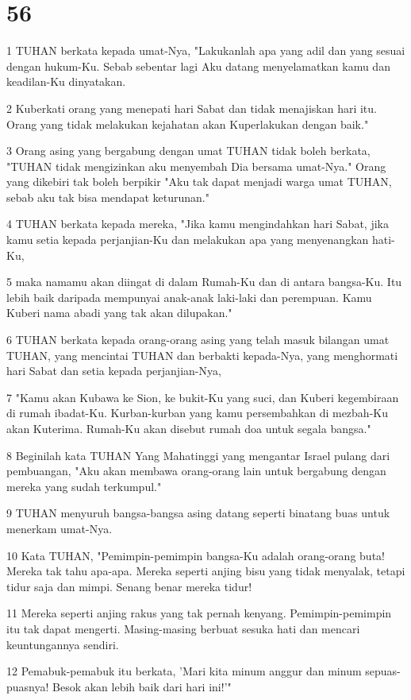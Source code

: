 \chapter{56}

\par 1 TUHAN berkata kepada umat-Nya, "Lakukanlah apa yang adil dan yang sesuai dengan hukum-Ku. Sebab sebentar lagi Aku datang menyelamatkan kamu dan keadilan-Ku dinyatakan.
\par 2 Kuberkati orang yang menepati hari Sabat dan tidak menajiskan hari itu. Orang yang tidak melakukan kejahatan akan Kuperlakukan dengan baik."
\par 3 Orang asing yang bergabung dengan umat TUHAN tidak boleh berkata, "TUHAN tidak mengizinkan aku menyembah Dia bersama umat-Nya." Orang yang dikebiri tak boleh berpikir "Aku tak dapat menjadi warga umat TUHAN, sebab aku tak bisa mendapat keturunan."
\par 4 TUHAN berkata kepada mereka, "Jika kamu mengindahkan hari Sabat, jika kamu setia kepada perjanjian-Ku dan melakukan apa yang menyenangkan hati-Ku,
\par 5 maka namamu akan diingat di dalam Rumah-Ku dan di antara bangsa-Ku. Itu lebih baik daripada mempunyai anak-anak laki-laki dan perempuan. Kamu Kuberi nama abadi yang tak akan dilupakan."
\par 6 TUHAN berkata kepada orang-orang asing yang telah masuk bilangan umat TUHAN, yang mencintai TUHAN dan berbakti kepada-Nya, yang menghormati hari Sabat dan setia kepada perjanjian-Nya,
\par 7 "Kamu akan Kubawa ke Sion, ke bukit-Ku yang suci, dan Kuberi kegembiraan di rumah ibadat-Ku. Kurban-kurban yang kamu persembahkan di mezbah-Ku akan Kuterima. Rumah-Ku akan disebut rumah doa untuk segala bangsa."
\par 8 Beginilah kata TUHAN Yang Mahatinggi yang mengantar Israel pulang dari pembuangan, "Aku akan membawa orang-orang lain untuk bergabung dengan mereka yang sudah terkumpul."
\par 9 TUHAN menyuruh bangsa-bangsa asing datang seperti binatang buas untuk menerkam umat-Nya.
\par 10 Kata TUHAN, "Pemimpin-pemimpin bangsa-Ku adalah orang-orang buta! Mereka tak tahu apa-apa. Mereka seperti anjing bisu yang tidak menyalak, tetapi tidur saja dan mimpi. Senang benar mereka tidur!
\par 11 Mereka seperti anjing rakus yang tak pernah kenyang. Pemimpin-pemimpin itu tak dapat mengerti. Masing-masing berbuat sesuka hati dan mencari keuntungannya sendiri.
\par 12 Pemabuk-pemabuk itu berkata, 'Mari kita minum anggur dan minum sepuas-puasnya! Besok akan lebih baik dari hari ini!'"


